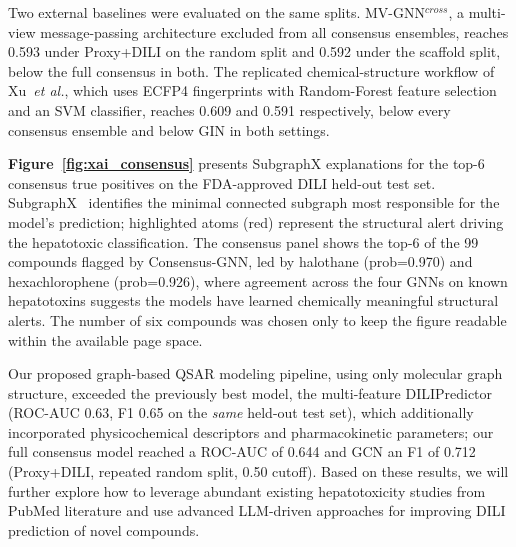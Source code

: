 \documentclass[letterpaper]{article}
\begin{document}

Two external baselines were evaluated on the same splits. MV-GNN$^{cross}$, a
multi-view message-passing architecture excluded from all consensus
ensembles, reaches 0.593 under Proxy+DILI on the random split and 0.592 under
the scaffold split, below the full consensus in both. The replicated
chemical-structure workflow of Xu~\textit{et al.}, which uses ECFP4
fingerprints with Random-Forest feature selection and an SVM classifier,
reaches 0.609 and 0.591 respectively, below every consensus ensemble and below
GIN in both settings.

\textbf{Figure~\ref{fig:xai_consensus}}
presents SubgraphX explanations for the top-6 consensus true positives on the FDA-approved DILI held-out test set. SubgraphX~\cite{yuan2021subgraphx} identifies the minimal connected subgraph most responsible for the model's prediction; highlighted atoms (red) represent the structural alert driving the hepatotoxic classification. The consensus panel shows the top-6 of the 99 compounds flagged by Consensus-GNN, led by halothane (prob=0.970) and hexachlorophene (prob=0.926), where agreement across the four GNNs on known hepatotoxins suggests the models have learned chemically meaningful structural alerts. The number of six compounds was chosen only to keep the figure readable within the available page space.

Our proposed graph-based QSAR modeling pipeline, using only molecular graph
structure, exceeded the previously best model, the multi-feature
DILIPredictor \cite{seal2024} (ROC-AUC 0.63, F1 0.65 on the \emph{same}
held-out test set), which additionally incorporated physicochemical
descriptors and pharmacokinetic parameters; our full consensus model reached a
ROC-AUC of 0.644 and GCN an F1 of 0.712 (Proxy+DILI, repeated random split,
0.50 cutoff). Based on these results, we will further explore how to leverage
abundant existing hepatotoxicity studies from PubMed literature and use
advanced LLM-driven approaches for improving DILI prediction of novel
compounds.
\end{document}
